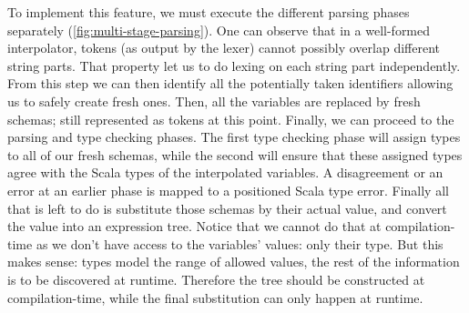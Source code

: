 To implement this feature, we must execute the different parsing phases separately (\autoref{fig:multi-stage-parsing}). One can observe that in a well-formed interpolator, tokens (as output by the lexer) cannot possibly overlap different string parts. That property let us to do lexing on each string part independently. From this step we can then identify all the potentially taken identifiers allowing us to safely create fresh ones. Then, all the variables are replaced by fresh schemas; still represented as tokens at this point. Finally, we can proceed to the parsing and type checking phases. The first type checking phase will assign types to all of our fresh schemas, while the second will ensure that these assigned types agree with the Scala types of the interpolated variables. A disagreement or an error at an earlier phase is mapped to a positioned Scala type error. Finally all that is left to do is substitute those schemas by their actual value, and convert the value into an expression tree. Notice that we cannot do that at compilation-time as we don't have access to the variables' values: only their type. But this makes sense: types model the range of allowed values, the rest of the information is to be discovered at runtime. Therefore the tree should be constructed at compilation-time, while the final substitution can only happen at runtime.
